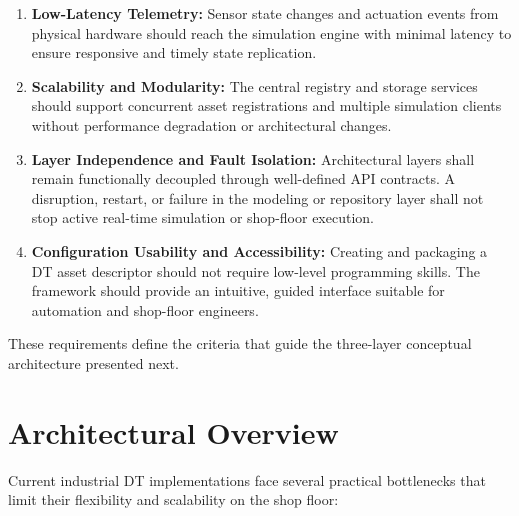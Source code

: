 \begin{enumerate}
    \item[\textbf{NFR1}] \textbf{Low-Latency Telemetry:} Sensor state changes and actuation events from physical hardware should reach the simulation engine with minimal latency to ensure responsive and timely state replication.

    \item[\textbf{NFR2}] \textbf{Scalability and Modularity:} The central registry and storage services should support concurrent asset registrations and multiple simulation clients without performance degradation or architectural changes.

    \item[\textbf{NFR3}] \textbf{Layer Independence and Fault Isolation:} Architectural layers shall remain functionally decoupled through well-defined \gls{API} contracts. A disruption, restart, or failure in the modeling or repository layer shall not stop active real-time simulation or shop-floor execution.

    \item[\textbf{NFR4}] \textbf{Configuration Usability and Accessibility:} Creating and packaging a \gls{DT} asset descriptor should not require low-level programming skills. The framework should provide an intuitive, guided interface suitable for automation and shop-floor engineers.
\end{enumerate}

These requirements define the criteria that guide the three-layer conceptual architecture presented next.


\section{Architectural Overview}
\label{sec:architecture_conceptual}

Current industrial \gls{DT} implementations face several practical bottlenecks that limit their flexibility and scalability on the shop floor:


